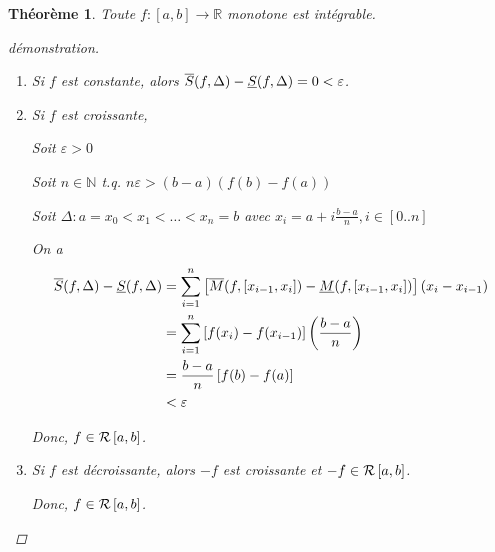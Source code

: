\documentclass{report}
\newcommand*{\eps}{\varepsilon}
\newcommand*{\reels}{\mathbb{R}}
\newcommand*{\naturels}{\mathbb{N}}
\newtheorem*{thm}{Th\'eor\`eme}
\theoremstyle{definition}
\theoremstyle{remark}
\begin{document}
	\begin{thm}
		Toute $f:[a,b] \to \reels$ monotone est int\'egrable.
		\begin{proof}[d\'emonstration]~

			\begin{enumerate}[label=(\arabic*)]
				\item Si $f$ est constante, alors $\ssup{f}-\sinf{f}=0<\eps$.
				\item Si $f$ est croissante,

				Soit $\eps>0$

				Soit $n \in \naturels$ t.q. $n\eps>(b-a)(f(b)-f(a))$

				Soit $\Delta:a=x_0<x_1<\dotsc<x_n=b$ avec $x_i=a+i\frac{b-a}{n}, i\in[0..n]$

				On a
				\begin{align*}
					\ssup{f}-\sinf{f}&= \sum_{i=1}^{n}\left[ \msup{f}[\left[ x_{i-1},x_i \right]] - \minf{f}[\left[ x_{i-1},x_i \right]] \right] (x_i-x_{i-1})\\
					&= \sum_{i=1}^{n}\left[ f(x_i) - f(x_{i-1}) \right] \left( \frac{b-a}{n} \right)\\
					&= \frac{b-a}{n} \left[ f(b)-f(a) \right]\\
					&< \eps
				\end{align*}

				Donc, $f \in \riemann$.
				\item Si $f$ est d\'ecroissante, alors $-f$ est croissante et $-f \in \riemann$.

				Donc, $f \in \riemann$.
			\end{enumerate}
		\end{proof}
	\end{thm}
\end{document}

